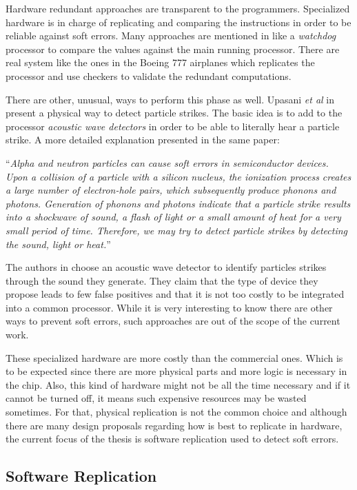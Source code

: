 Hardware redundant approaches are transparent to the programmers. Specialized hardware is in charge of replicating and comparing the instructions in order to be reliable against soft errors. Many approaches are mentioned in \cite{reis2005swift} like a \textit{watchdog} processor to compare the values against the main running processor. There are real system like the ones in the Boeing 777 airplanes \cite{yeh1996triple} which replicates the processor and use checkers to validate the redundant computations.

There are other, unusual, ways to perform this phase as well. Upasani \textit{et al} in \cite{upasani2014avoiding} present a physical way to detect particle strikes. The basic idea is to add to the processor \textit{acoustic wave detectors} in order to be able to literally hear a particle strike. A more detailed explanation presented in the same paper: 

``\emph{Alpha and neutron particles can cause soft errors in semiconductor devices. Upon a collision of a particle with a silicon nucleus, the ionization process creates a large number of electron-hole pairs, which subsequently produce phonons and photons. Generation of phonons and photons indicate that a particle strike results into a shockwave of sound, a flash of light or a small amount of heat for a very small period of time. Therefore, we may try to detect particle strikes by detecting the sound, light or heat.}''

The authors in \cite{upasani2014avoiding} choose an acoustic wave detector to identify particles strikes through the sound they generate. They claim that the type of device they propose leads to few false positives and that it is not too costly to be integrated into a common processor. While it is very interesting to know there are other ways to prevent soft errors, such approaches are out of the scope of the current work. 

These specialized hardware are more costly than the commercial ones. Which is to be expected since there are more physical parts and more logic is necessary in the chip. Also, this kind of hardware might not be all the time necessary and if it cannot be turned off, it means such expensive resources may be wasted sometimes. For that, physical replication is not the common choice and although there are many design proposals regarding how is best to replicate in hardware, the current focus of the thesis is software replication used to detect soft errors. 

\subsection{Software Replication}
\label{subsec:softwareReplication}

